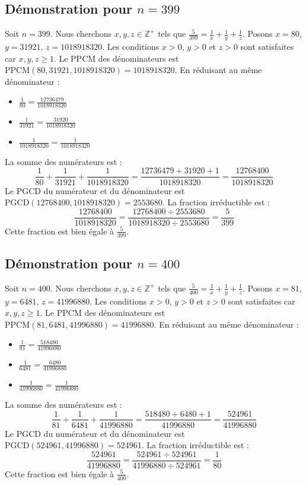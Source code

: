\documentclass[11pt,a4paper]{article}
\begin{document}
\subsection{Démonstration pour $n = 399$}
Soit $n = 399$. Nous cherchons $x, y, z \in \mathbb{Z}^{+}$ tels que $\frac{5}{399} = \frac{1}{x} + \frac{1}{y} + \frac{1}{z}$.
Posons $x = 80$, $y = 31921$, $z = 1018918320$.
Les conditions $x > 0$, $y > 0$ et $z > 0$ sont satisfaites car $x, y, z \geq 1$.
Le PPCM des dénominateurs est $\text{PPCM}(80, 31921, 1018918320) = 1018918320$.
En réduisant au même dénominateur :
\begin{itemize}
    \item $\frac{1}{80} = \frac{12736479}{1018918320}$
    \item $\frac{1}{31921} = \frac{31920}{1018918320}$
    \item $\frac{1}{1018918320} = \frac{1}{1018918320}$
\end{itemize}
La somme des numérateurs est :
$$ \frac{1}{80} + \frac{1}{31921} + \frac{1}{1018918320} = \frac{12736479 + 31920 + 1}{1018918320} = \frac{12768400}{1018918320} $$
Le PGCD du numérateur et du dénominateur est $\text{PGCD}(12768400, 1018918320) = 2553680$.
La fraction irréductible est :
$$ \frac{12768400}{1018918320} = \frac{12768400 \div 2553680}{1018918320 \div 2553680} = \frac{5}{399} $$
Cette fraction est bien égale à $\frac{5}{399}$.

\subsection{Démonstration pour $n = 400$}
Soit $n = 400$. Nous cherchons $x, y, z \in \mathbb{Z}^{+}$ tels que $\frac{5}{400} = \frac{1}{x} + \frac{1}{y} + \frac{1}{z}$.
Posons $x = 81$, $y = 6481$, $z = 41996880$.
Les conditions $x > 0$, $y > 0$ et $z > 0$ sont satisfaites car $x, y, z \geq 1$.
Le PPCM des dénominateurs est $\text{PPCM}(81, 6481, 41996880) = 41996880$.
En réduisant au même dénominateur :
\begin{itemize}
    \item $\frac{1}{81} = \frac{518480}{41996880}$
    \item $\frac{1}{6481} = \frac{6480}{41996880}$
    \item $\frac{1}{41996880} = \frac{1}{41996880}$
\end{itemize}
La somme des numérateurs est :
$$ \frac{1}{81} + \frac{1}{6481} + \frac{1}{41996880} = \frac{518480 + 6480 + 1}{41996880} = \frac{524961}{41996880} $$
Le PGCD du numérateur et du dénominateur est $\text{PGCD}(524961, 41996880) = 524961$.
La fraction irréductible est :
$$ \frac{524961}{41996880} = \frac{524961 \div 524961}{41996880 \div 524961} = \frac{1}{80} $$
Cette fraction est bien égale à $\frac{5}{400}$.
\end{document}
